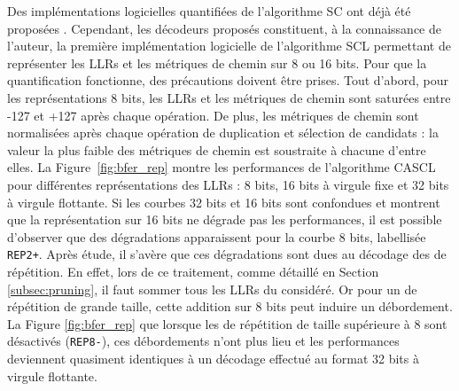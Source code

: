 Des implémentations logicielles quantifiées de l'algorithme SC ont déjà été proposées \cite{giard_low-latency_2016}.
 Cependant, les décodeurs proposés constituent, à la connaissance de l'auteur, la première implémentation logicielle de l'algorithme SCL permettant de représenter les LLRs et les métriques de chemin sur 8 ou 16 bits.
Pour que la quantification fonctionne, des précautions doivent être prises.
Tout d'abord, pour les représentations 8 bits, les LLRs et les métriques de chemin sont saturées entre -127 et +127 après chaque opération.
De plus, les métriques de chemin sont normalisées après chaque opération de duplication et sélection de candidats : la valeur la plus faible des métriques de chemin est soustraite à chacune d'entre elles.
La Figure~\ref{fig:bfer_rep} montre les performances de l'algorithme CASCL pour différentes représentations des LLRs : 8 bits, 16 bits à virgule fixe et 32 bits à virgule flottante.
Si les courbes 32 bits et 16 bits sont confondues et montrent que la représentation sur 16 bits ne dégrade pas les performances, il est possible d'observer que des dégradations apparaissent pour la courbe 8 bits, labellisée \texttt{REP2+}.
Après étude, il s'avère que ces dégradations sont dues au décodage des \noeuds de répétition.
En effet, lors de ce traitement, comme détaillé en Section \ref{subsec:pruning}, il faut sommer tous les LLRs du \noeud considéré.
Or pour un \noeud de répétition de grande taille, cette addition sur 8 bits peut induire un débordement.
La Figure \ref{fig:bfer_rep} que lorsque les \noeuds de répétition de taille supérieure à 8 sont désactivés (\texttt{REP8-}), ces débordements n'ont plus lieu et les performances deviennent quasiment identiques à un décodage effectué au format 32 bits à virgule flottante.


